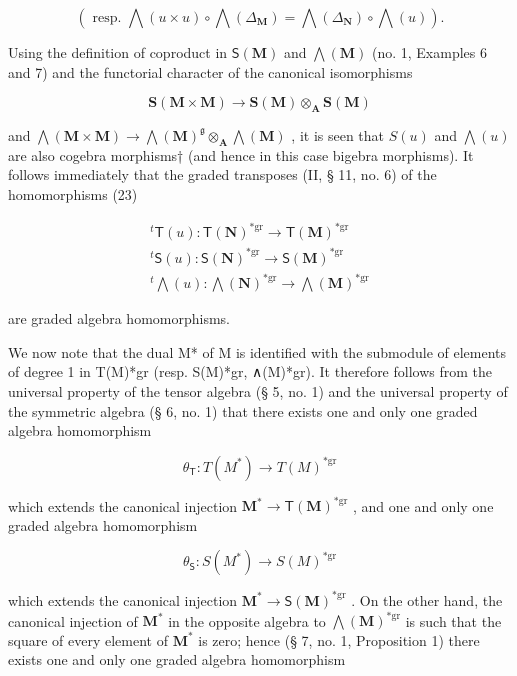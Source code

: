 \[
(\text { resp. } \bigwedge (u \times u) \circ \bigwedge (\Delta_ {\mathbf {M}}) = \bigwedge (\Delta_ {\mathbf {N}}) \circ \bigwedge (u)).
\]

Using the definition of coproduct in \(\mathsf{S}(\mathbf{M})\) and \(\bigwedge (\mathbf{M})\) (no. 1, Examples 6 and 7) and the functorial character of the canonical isomorphisms

\[
\mathbf {S} (\mathbf {M} \times \mathbf {M}) \rightarrow \mathbf {S} (\mathbf {M}) \otimes_ {\mathbf {A}} \mathbf {S} (\mathbf {M})
\]

and \(\bigwedge (\mathbf{M}\times \mathbf{M})\to \bigwedge (\mathbf{M})^{\mathfrak{g}}\otimes_{\mathbf{A}}\bigwedge (\mathbf{M})\) , it is seen that \(S(u)\) and \(\bigwedge (u)\) are also cogebra morphisms† (and hence in this case bigebra morphisms). It follows immediately that the graded transposes (II, § 11, no. 6) of the homomorphisms (23)

\[
\begin{array}{c} ^ {t} \mathsf {T} (u): \mathsf {T} (\mathbf {N}) ^ {* \mathrm{gr}} \to \mathsf {T} (\mathbf {M}) ^ {* \mathrm{gr}} \\ ^ {t} \mathsf {S} (u): \mathsf {S} (\mathbf {N}) ^ {* \mathrm{gr}} \to \mathsf {S} (\mathbf {M}) ^ {* \mathrm{gr}} \\ ^ {t} \bigwedge (u): \bigwedge (\mathbf {N}) ^ {* \mathrm{gr}} \to \bigwedge (\mathbf {M}) ^ {* \mathrm{gr}} \end{array}
\]

are graded algebra homomorphisms.

We now note that the dual M* of M is identified with the submodule of elements of degree 1 in T(M)*gr (resp. S(M)*gr, ∧(M)*gr). It therefore follows from the universal property of the tensor algebra (§ 5, no. 1) and the universal property of the symmetric algebra (§ 6, no. 1) that there exists one and only one graded algebra homomorphism

\[
\theta_ {\mathsf {T}}: T (M ^ {*}) \rightarrow T (M) ^ {* \mathrm{gr}}
\]

which extends the canonical injection \(\mathbf{M}^{*}\to \mathsf{T}(\mathbf{M})^{*\mathrm{gr}}\) , and one and only one graded algebra homomorphism

\[
\theta_ {\mathsf {S}}: S (M ^ {*}) \rightarrow S (M) ^ {* \mathrm{gr}}
\]

which extends the canonical injection \(\mathbf{M}^{*}\to\mathsf{S}(\mathbf{M})^{*\mathrm{gr}}\) . On the other hand, the canonical injection of \(\mathbf{M}^{*}\) in the opposite algebra to \(\bigwedge(\mathbf{M})^{*\mathrm{gr}}\) is such that the square of every element of \(\mathbf{M}^{*}\) is zero; hence (§ 7, no. 1, Proposition 1) there exists one and only one graded algebra homomorphism

